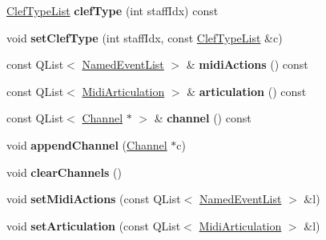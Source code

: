\begin{DoxyCompactItemize}
\item 
\mbox{\label{class_ms_1_1_instrument_a32a720606d9b468ca7c5ddd5ff12bf13}} 
\hyperlink{struct_ms_1_1_clef_type_list}{Clef\+Type\+List} {\bfseries clef\+Type} (int staff\+Idx) const
\item 
\mbox{\label{class_ms_1_1_instrument_a238574689702903909650b8b1cb08f10}} 
void {\bfseries set\+Clef\+Type} (int staff\+Idx, const \hyperlink{struct_ms_1_1_clef_type_list}{Clef\+Type\+List} \&c)
\item 
\mbox{\label{class_ms_1_1_instrument_a00b44e7232b9cc810fd3becc7bf96c22}} 
const Q\+List$<$ \hyperlink{struct_ms_1_1_named_event_list}{Named\+Event\+List} $>$ \& {\bfseries midi\+Actions} () const
\item 
\mbox{\label{class_ms_1_1_instrument_a370e641cf45c27a5b61c941ff710eed1}} 
const Q\+List$<$ \hyperlink{struct_ms_1_1_midi_articulation}{Midi\+Articulation} $>$ \& {\bfseries articulation} () const
\item 
\mbox{\label{class_ms_1_1_instrument_a186a430816fe22e7a3a0fe4fcc21467e}} 
const Q\+List$<$ \hyperlink{struct_ms_1_1_channel}{Channel} $\ast$ $>$ \& {\bfseries channel} () const
\item 
\mbox{\label{class_ms_1_1_instrument_aaec70bfa6c33bac938ff13ac6c28f06f}} 
void {\bfseries append\+Channel} (\hyperlink{struct_ms_1_1_channel}{Channel} $\ast$c)
\item 
\mbox{\label{class_ms_1_1_instrument_ab55a4ff72eff8ca506c07178a962a243}} 
void {\bfseries clear\+Channels} ()
\item 
\mbox{\label{class_ms_1_1_instrument_a5615222c1ec456e28c4bba1dabb53318}} 
void {\bfseries set\+Midi\+Actions} (const Q\+List$<$ \hyperlink{struct_ms_1_1_named_event_list}{Named\+Event\+List} $>$ \&l)
\item 
\mbox{\label{class_ms_1_1_instrument_a4b72f2b1b17707258c1bdb4ca472e487}} 
void {\bfseries set\+Articulation} (const Q\+List$<$ \hyperlink{struct_ms_1_1_midi_articulation}{Midi\+Articulation} $>$ \&l)

\end{DoxyCompactItemize}

